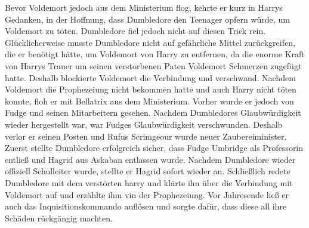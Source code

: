 \documentclass[a4paper, 10pt]{article}
\begin{document}
\vspace{10pt}
\newline
Bevor Voldemort jedoch aus dem Ministerium flog, kehrte er kurz in Harrys Gedanken, in der Hoffnung, dass Dumbledore den Teenager opfern würde, um Voldemort zu töten. Dumbledore fiel jedoch nicht auf diesen Trick rein. Glücklicherweise musste Dumbledore nicht auf gefährliche Mittel zurückgreifen, die er benötigt hätte, um Voldemort von Harry zu entfernen, da die enorme Kraft von Harrys Trauer um seinen verstorbenen Paten Voldemort Schmerzen zugefügt hatte. Deshalb blockierte Voldemort die Verbindung und verschwand. Nachdem Voldemort die Prophezeiung nicht bekommen hatte und auch Harry nicht töten konnte, floh er mit Bellatrix aus dem Ministerium. Vorher wurde er jedoch von Fudge und seinen Mitarbeitern gesehen. Nachdem Dumbledores Glaubwürdigkeit wieder hergestellt war, war Fudges Glaubwürdigkeit verschwunden. Deshalb verlor er seinen Posten und Rufus Scrimgeour wurde neuer Zaubereiminister. Zuerst stellte Dumbledore erfolgreich sicher, dass Fudge Umbridge als Professorin entließ und Hagrid aus Askaban entlassen wurde. Nachdem Dumbledore wieder offiziell Schulleiter wurde, stellte er Hagrid sofort wieder an. Schließlich redete Dumbledore mit dem verstörten harry und klärte ihn über die Verbindung mit Voldemort auf und erzählte ihm vin der Prophezeiung. Vor Jahresende ließ er auch das Inquisitionskommando auflösen und sorgte dafür, dass diese all ihre Schäden rückgängig machten.
\end{document}

